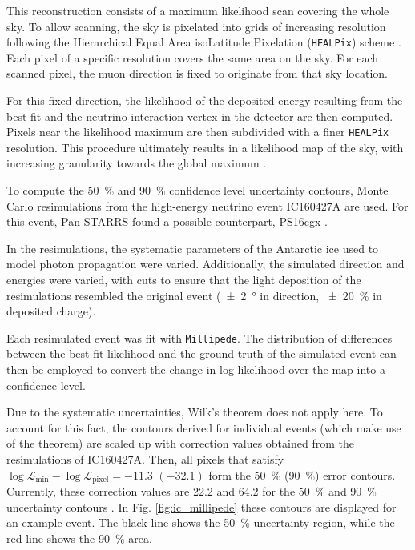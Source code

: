 \documentclass[
    a4paper, %
    fontsize=10pt, %
    twoside=false, %
    numbers=noenddot, %
    fontmethod=tex,
]{kaobook}
\begin{document}
This reconstruction consists of a maximum likelihood scan covering the whole sky. To allow scanning, the sky is pixelated into grids of increasing resolution following the Hierarchical Equal Area isoLatitude Pixelation (\texttt{HEALPix}) scheme . Each pixel of a specific resolution covers the same area on the sky. For each scanned pixel, the muon direction is fixed to originate from that sky location.

For this fixed direction, the likelihood of the deposited energy resulting from the best fit and the neutrino interaction vertex in the detector are then computed. Pixels near the likelihood maximum are then subdivided with a finer \texttt{HEALPix} resolution. This procedure ultimately results in a likelihood map of the sky, with increasing granularity towards the global maximum .

To compute the \SI{50}{\percent} and \SI{90}{\percent} confidence level uncertainty contours, Monte Carlo resimulations from the high-energy neutrino event IC160427A are used. For this event, Pan-STARRS found a possible counterpart, PS16cgx .

In the resimulations, the systematic parameters of the Antarctic ice used to model photon propagation were varied. Additionally, the simulated direction and energies were varied, with cuts to ensure that the light deposition of the resimulations resembled the original event (\SI{\pm 2}{\degree} in direction, \SI{\pm 20}{\percent} in deposited charge).

Each resimulated event was fit with \texttt{Millipede}. The distribution of differences between the best-fit likelihood and the ground truth of the simulated event can then be employed to convert the change in log-likelihood over the map into a confidence level.

Due to the systematic uncertainties, Wilk's theorem does not apply here. To account for this fact, the contours derived for individual events (which make use of the theorem) are scaled up with correction values obtained from the resimulations of IC160427A. Then, all pixels that satisfy $\log \mathcal{L}_\text{min}-\log \mathcal{L}_\text{pixel} = -11.3$ $(-32.1)$ form the \SI{50}{\percent} (\SI{90}{\percent}) error contours. Currently, these correction values are 22.2 and 64.2 for the \SI{50}{\percent} and \SI{90}{\percent} uncertainty contours . In Fig. \ref{fig:ic_millipede} these contours are displayed for an example event. The black line shows the \SI{50}{\percent} uncertainty region, while the red line shows the \SI{90}{\percent} area.
\end{document}
